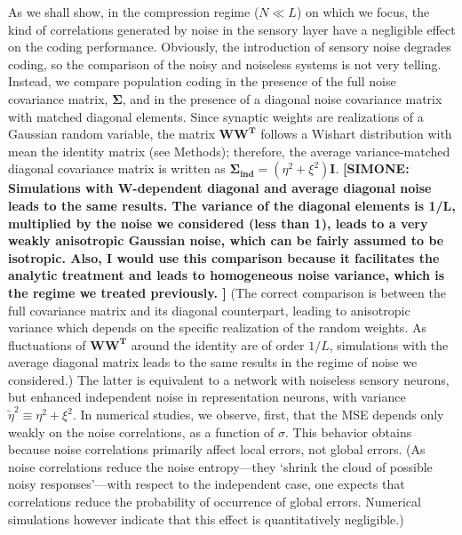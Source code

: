 \documentclass[a4paper]{article}%
\begin{document}
As we shall show, in the compression regime ($N\ll L$) on which we focus, the
kind of correlations generated by noise in the sensory layer have a negligible
effect on the coding performance. Obviously, the introduction of sensory noise
degrades coding, so the comparison of the noisy and noiseless systems is not
very telling. Instead, we compare population coding in the presence of the
full noise covariance matrix, $\bm{\Sigma}$, and in the presence of a diagonal
noise covariance matrix with matched diagonal elements. Since synaptic weights
are realizations of a Gaussian random variable, the matrix $\mathbf{WW^{T}}$
follows a Wishart distribution with mean the identity matrix (see Methods);
therefore, the average variance-matched diagonal covariance matrix is written
as $\bm{\Sigma_{\text{ind}}}=\left(  \eta^{2}+\xi^{2}\right)  \mathbf{I}.$
\textbf{[SIMONE: Simulations with W-dependent diagonal and average diagonal noise leads to the same results. The variance of the diagonal elements is 1/L, multiplied by the noise we considered (less than 1), leads to a very weakly anisotropic Gaussian noise, which can be fairly assumed to be isotropic. Also, I would use this comparison because it facilitates the analytic treatment and leads to homogeneous noise variance, which is the regime we treated previously. ]}
(The correct comparison is between the full covariance matrix and its diagonal counterpart, leading to anisotropic variance which depends on the specific realization of the random weights. As fluctuations of $\mathbf{WW^{T}}$ around the identity are of order $1/L$, simulations with the average diagonal matrix leads to the same results in the regime of noise we considered.)
The latter is equivalent to a network with noiseless sensory neurons, but
enhanced independent noise in representation neurons, with variance
$\tilde{\eta}^{2}\equiv\eta^{2}+\xi^{2}$. In numerical studies, we observe,
first, that the MSE depends only weakly on the noise correlations, as a
function of $\sigma$. This behavior obtains because noise correlations
primarily affect local errors, not global errors. (As noise correlations
reduce the noise entropy---they `shrink the cloud of possible noisy
responses'---with respect to the independent case, one expects that
correlations reduce the probability of occurrence of global errors. Numerical
simulations however indicate that this effect is quantitatively negligible.)
\end{document}
